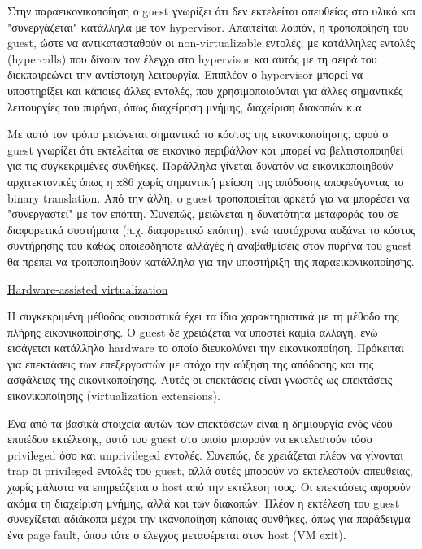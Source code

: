 Στην παραεικονικοποίηση ο guest γνωρίζει ότι δεν εκτελείται απευθείας στο υλικό
και "συνεργάζεται" κατάλληλα με τον hypervisor. Απαιτείται λοιπόν, η τροποποίηση
του guest, ώστε να αντικατασταθούν οι non-virtualizable εντολές, με κατάλληλες
εντολές (hypercalls) που δίνουν τον έλεγχο στο hypervisor και αυτός με τη σειρά του διεκπαιρεώνει την αντίστοιχη λειτουργία. Επιπλέον ο hypervisor μπορεί να
υποστηρίξει και κάποιες άλλες εντολές, που χρησιμοποιούνται για άλλες σημαντικές
λειτουργίες του πυρήνα, όπως διαχείρηση μνήμης, διαχείριση διακοπών κ.α. 

Με αυτό τον τρόπο μειώνεται σημαντικά το κόστος της εικονικοποίησης, αφού ο
guest γνωρίζει ότι εκτελείται σε εικονικό περιβάλλον και μπορεί να
βελτιστοποιηθεί για τις συγκεκριμένες συνθήκες. Παράλληλα γίνεται
δυνατόν να εικονικοποιηθούν αρχιτεκτονικές όπως η x86 χωρίς σημαντική μείωση
της απόδοσης αποφεύγοντας το binary translation. Από την άλλη, o guest
τροποποιείται αρκετά για να μπορέσει να "συνεργαστεί" με τον επόπτη. Συνεπώς, 
μειώνεται η δυνατότητα μεταφοράς του σε διαφορετικά συστήματα (π.χ. διαφορετικό
επόπτη), ενώ ταυτόχρονα αυξάνει το κόστος συντήρησης του καθώς οποιεσδήποτε
αλλάγές ή αναβαθμίσεις στον πυρήνα του guest θα πρέπει να τροποποιηθούν
κατάλληλα για την υποστήριξη της παραεικονικοποίησης.

\vspace{2ex}
\underline{Hardware-assisted virtualization}

\vspace{1ex}

Η συγκεκριμένη μέθοδος ουσιαστικά έχει τα ίδια χαρακτηριστικά με τη μέθοδο της
πλήρης εικονικοποίησης. Ο guest δε χρειάζεται να υποστεί καμία αλλαγή, ενώ
εισάγεται κατάλληλο hardware το οποίο διευκολύνει την εικονικοποίηση. Πρόκειται
για επεκτάσεις των επεξεργαστών με στόχο την αύξηση της απόδοσης και της
ασφάλειας της εικονικοποίησης. Αυτές οι επεκτάσεις είναι γνωστές ως επεκτάσεις
εικονικοποίησης (virtualization extensions). 

Ένα από τα βασικά στοιχεία αυτών των επεκτάσεων είναι η δημιουργία ενός νέου
επιπέδου εκτέλεσης, αυτό του guest στο οποίο μπορούν να εκτελεστούν τόσο
privileged όσο και unprivileged εντολές. Συνεπώς, δε χρειάζεται πλέον να
γίνονται trap οι privileged εντολές του guest, αλλά αυτές μπορούν να εκτελεστούν
απευθείας, χωρίς μάλιστα να επηρεάζεται ο host από την εκτέλεση τους. Οι
επεκτάσεις αφορούν ακόμα τη διαχείριση μνήμης, αλλά και των διακοπών. Πλέον η
εκτέλεση του guest συνεχίζεται αδιάκοπα μέχρι την ικανοποίηση κάποιας συνθήκες,
όπως για παράδειγμα ένα page fault, όπου τότε ο έλεγχος μεταφέρεται στον host
(VM exit). 

